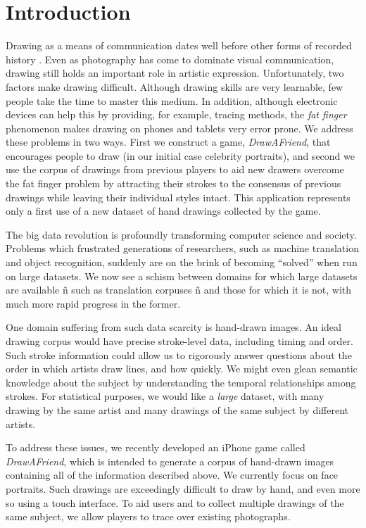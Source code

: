 \section{Introduction}

Drawing as a means of communication dates well before other forms of
recorded history . Even as photography has come to dominate visual
communication, drawing still holds an important role in artistic
expression. Unfortunately, two factors make drawing difficult.
Although drawing skills are very learnable, few people take the time
to master this medium. In addition, although electronic devices can
help this by providing, for example, tracing methods, the {\em fat
finger} phenomenon makes drawing on phones and tablets very error
prone. We address these problems in two ways. First we construct a
game, {\em DrawAFriend}, that encourages people to draw (in our
initial case celebrity portraits), and second we use the corpus of
drawings from previous players to aid new drawers overcome 
 the fat
finger problem by attracting their strokes to the consensus of
previous drawings while leaving their individual styles intact. This
application represents only a first use of a new dataset of hand
drawings collected by the game.

The big data revolution is profoundly transforming computer science
and society. Problems which frustrated generations of researchers,
such as machine translation and object recognition, suddenly are on
the brink of becoming ``solved'' when run on large datasets. We now
see a schism between domains for which large datasets are available
ñ such as translation corpuses ñ and those for which it is not,
with much more rapid progress in the former.

One domain suffering from such data scarcity is hand-drawn images.
An ideal drawing corpus would have precise stroke-level data,
including timing and order. Such stroke information could allow us
to rigorously answer questions about the order in which artists draw
lines, and how quickly. We might even glean semantic knowledge about
the subject by understanding the temporal relationships among
strokes. For statistical purposes, we would like a \emph{large}
dataset, with many drawing by the same artist and many drawings of
the same subject by different artists.

To address these issues, we recently developed an iPhone game called
\emph{DrawAFriend}, which is intended to generate a corpus of
hand-drawn images containing all of the information described above.
We currently focus on face portraits. Such drawings are exceedingly
difficult to draw by hand, and even more so using a touch interface.
To aid users and to collect multiple drawings of the same subject,
we allow players to trace over existing photographs.

